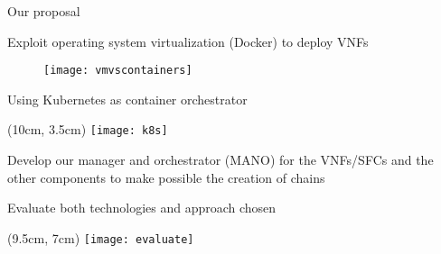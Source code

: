 \begin{frame}{Our proposal}

  \vspace*{-0.2cm}

  Exploit operating system virtualization (Docker) to deploy VNFs

  \begin{figure}
    \centering
    \texttt{[image: vmvscontainers]}
  \end{figure}

  Using Kubernetes as container orchestrator

  \vspace{1cm}

  \begin{textblock*}{1cm}(10cm, 3.5cm)
    \texttt{[image: k8s]}
  \end{textblock*}

  Develop our manager and orchestrator (MANO) for the VNFs/SFCs and the other
  components to make possible the creation of chains

  \vspace{1cm}

  Evaluate both technologies and approach chosen

  \vspace{1cm}

  \begin{textblock*}{1cm}(9.5cm, 7cm)
    \texttt{[image: evaluate]}
  \end{textblock*}

\end{frame}
